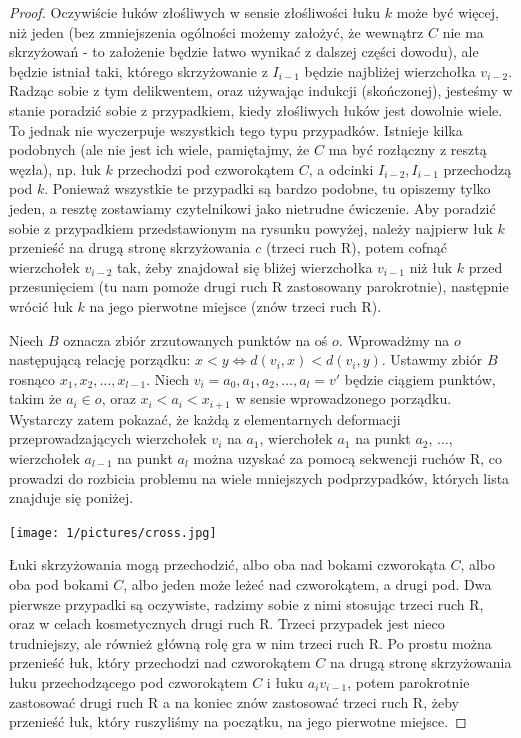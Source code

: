 \begin{proof}
Oczywiście łuków złośliwych w sensie złośliwości łuku $k$ może być więcej, niż jeden (bez zmniejszenia ogólności możemy założyć, że wewnątrz $C$ nie ma skrzyżowań - 
to założenie będzie łatwo wynikać z dalszej części dowodu), ale będzie istniał taki, którego skrzyżowanie z $I_{i-1}$ będzie najbliżej wierzchołka $v_{i-2}$.
Radząc sobie z tym delikwentem, oraz używając indukcji (skończonej), jesteśmy w stanie poradzić sobie z przypadkiem, kiedy złośliwych łuków jest dowolnie wiele. To jednak nie wyczerpuje
wszystkich tego typu przypadków. Istnieje kilka podobnych (ale nie jest ich wiele, pamiętajmy, że $C$ ma być rozłączny z resztą węzła), np. łuk $k$ przechodzi pod czworokątem $C$, a odcinki $I_{i-2}, I_{i-1}$ przechodzą pod $k$. 
Ponieważ wszystkie te przypadki są bardzo podobne, tu opiszemy tylko jeden, a resztę zostawiamy czytelnikowi jako nietrudne ćwiczenie.
Aby poradzić sobie z przypadkiem przedstawionym na rysunku powyżej, należy najpierw łuk $k$ przenieść na drugą stronę skrzyżowania $c$ (trzeci ruch R), potem cofnąć wierzchołek $v_{i-2}$
tak, żeby znajdował się bliżej wierzchołka $v_{i-1}$ niż łuk $k$ przed przesunięciem (tu nam pomoże drugi ruch R zastosowany parokrotnie), 
następnie wrócić łuk $k$ na jego pierwotne miejsce (znów trzeci ruch R).
 

Niech $B$ oznacza zbiór zrzutowanych punktów na oś $o$. Wprowadżmy na $o$ następującą relację porządku: $x < y\iff d(v_i,x) < d(v_i, y)$. Ustawmy zbiór $B$ rosnąco $x_1, x_2, \ldots, x_{l-1}$.
Niech $v_i = a_0, a_1, a_2, \ldots, a_l = v'$ będzie ciągiem punktów, takim że $a_i\in o$, oraz $x_i < a_i < x_{i+1}$ w sensie wprowadzonego porządku. 
Wystarczy zatem pokazać, że każdą z elementarnych deformacji przeprowadzających wierzchołek $v_i$ na $a_1$, wierchołek $a_1$ na punkt $a_2$, $\ldots$, 
wierzchołek $a_{l-1}$ na punkt $a_l$ można uzyskać za pomocą sekwencji ruchów R, co prowadzi do rozbicia problemu na wiele mniejszych podprzypadków, których lista znajduje się
poniżej.


	\begin{center}

	\texttt{[image: 1/pictures/cross.jpg]}
	\end{center}

Łuki skrzyżowania mogą przechodzić, albo oba nad bokami czworokąta $C$, albo oba pod bokami $C$, albo jeden może leżeć nad czworokątem, a drugi pod. Dwa pierwsze przypadki są oczywiste,
radzimy sobie z nimi stosując trzeci ruch R, oraz w celach kosmetycznych drugi ruch R. Trzeci przypadek jest nieco trudniejszy, ale również główną rolę gra w nim trzeci ruch R. Po
prostu można przenieść łuk, który przechodzi nad czworokątem $C$ na drugą stronę skrzyżowania łuku przechodzącego pod czworokątem $C$ i łuku $a_i v_{i-1}$, potem parokrotnie zastosować
drugi ruch R a na koniec znów zastosować trzeci ruch R, żeby przenieść łuk, który ruszyliśmy na początku, na jego pierwotne miejsce.



\end{proof}
